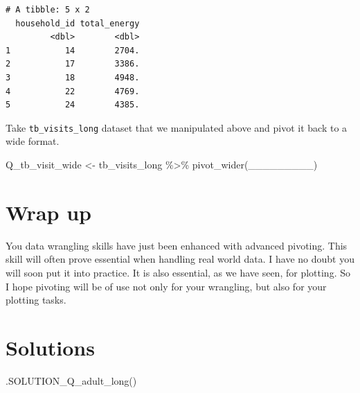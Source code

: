 \documentclass[
  letterpaper,
  DIV=11,
  numbers=noendperiod]{scrreprt}
\newenvironment{Shaded}{\begin{snugshade}}{\end{snugshade}}
\newcommand{\FunctionTok}[1]{\textcolor[rgb]{0.28,0.35,0.67}{#1}}
\newcommand{\NormalTok}[1]{\textcolor[rgb]{0.00,0.23,0.31}{#1}}
\newcommand{\OtherTok}[1]{\textcolor[rgb]{0.00,0.23,0.31}{#1}}
\newcommand{\SpecialCharTok}[1]{\textcolor[rgb]{0.37,0.37,0.37}{#1}}
\begin{document}
\begin{verbatim}
# A tibble: 5 x 2
  household_id total_energy
         <dbl>        <dbl>
1           14        2704.
2           17        3386.
3           18        4948.
4           22        4769.
5           24        4385.
\end{verbatim}

\begin{tcolorbox}[enhanced jigsaw, colframe=quarto-callout-tip-color-frame, rightrule=.15mm, opacityback=0, breakable, coltitle=black, colbacktitle=quarto-callout-tip-color!10!white, bottomrule=.15mm, leftrule=.75mm, toprule=.15mm, arc=.35mm, bottomtitle=1mm, colback=white, left=2mm, opacitybacktitle=0.6, titlerule=0mm, title=\textcolor{quarto-callout-tip-color}{\faLightbulb}\hspace{0.5em}{Practice}, toptitle=1mm]

Take \texttt{tb\_visits\_long} dataset that we manipulated above and
pivot it back to a wide format.

\begin{Shaded}
\begin{Highlighting}[]
\NormalTok{Q\_tb\_visit\_wide }\OtherTok{\textless{}{-}}
\NormalTok{  tb\_visits\_long }\SpecialCharTok{\%\textgreater{}\%}
  \FunctionTok{pivot\_wider}\NormalTok{(\_\_\_\_\_\_\_\_\_)}
\end{Highlighting}
\end{Shaded}

\end{tcolorbox}

\hypertarget{wrap-up-10}{%
\section{Wrap up}\label{wrap-up-10}}

You data wrangling skills have just been enhanced with advanced
pivoting. This skill will often prove essential when handling real world
data. I have no doubt you will soon put it into practice. It is also
essential, as we have seen, for plotting. So I hope pivoting will be of
use not only for your wrangling, but also for your plotting tasks.

\hypertarget{solutions-8}{%
\section{Solutions}\label{solutions-8}}

\begin{Shaded}
\begin{Highlighting}[]
\FunctionTok{.SOLUTION\_Q\_adult\_long}\NormalTok{()}
\end{Highlighting}
\end{Shaded}
\end{document}

